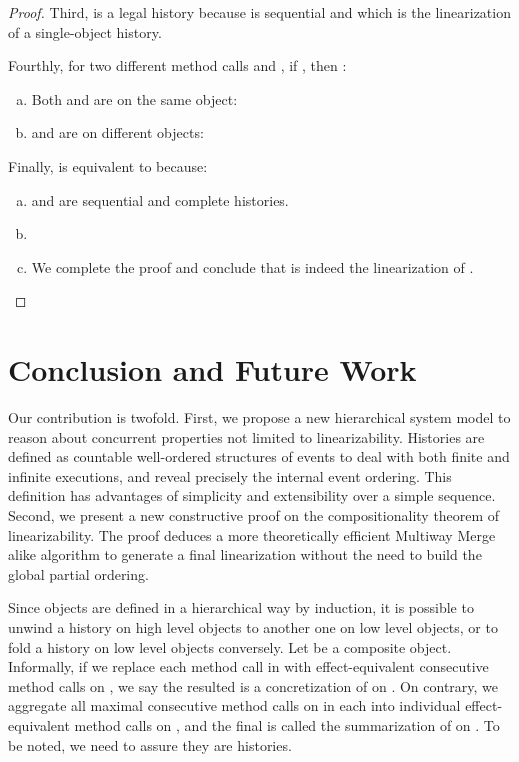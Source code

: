 \documentclass[a4paper,USenglish]{lipics-v2016}
\newcommand{\lin}{linearizability}
\newcommand{\linz}{linearization}
\newcommand{\his}{\text{H}}
\newcommand{\shis}{\text{S}}
\begin{document}
\begin{proof}
	Third, {\shis} is a legal history because {\shis} is sequential and  which is the {\linz} of a single-object history.
	
	Fourthly, for two different method calls  and , if , then :
	\begin{enumerate}[(a)]
		\item
		Both  and  are on the same object:
		
		\item
		 and  are on different objects:
		
	\end{enumerate}
	
	Finally, {\shis} is equivalent to  because:
	\begin{enumerate}[(a)]
		\item
		 and  are sequential and complete histories.
		\item
		
		\item
		
		We complete the proof and conclude that {\shis} is indeed the {\linz} of {\his}.
	\end{enumerate}
\end{proof}

\section{Conclusion and Future Work}\label{sec:discussion}
Our contribution is twofold.
First, we propose a new hierarchical system model to reason about concurrent properties not limited to {\lin}.
Histories are defined as countable well-ordered structures of events
to deal with both finite and infinite executions, and reveal precisely the internal event ordering.
This definition has advantages of simplicity and extensibility over a simple sequence. 
Second, we present a new constructive proof on the compositionality theorem of {\lin}.
The proof deduces a more theoretically efficient Multiway Merge alike algorithm to generate a final {\linz} without the need to build the global partial ordering.

Since objects are defined in a hierarchical way by induction,
it is possible to unwind a history on high level objects to another one on low level objects,
or to fold a history on low level objects conversely.
Let  be a composite object.
Informally, if we replace each method call in  with effect-equivalent consecutive method calls on ,
we say the resulted  is a concretization of  on .
On contrary, we aggregate all maximal consecutive method calls on  in each  into individual effect-equivalent method calls on ,
and the final  is called the summarization of  on .
To be noted, we need to assure they are histories.
\end{document}
